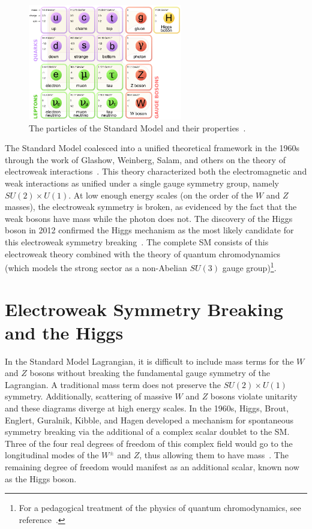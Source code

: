 \begin{figure}[h!]
  \centering
  \captionsetup{justification=centering}

  \includegraphics[width=0.6\textwidth]{figures/SM_particles}
  \caption{The particles of the Standard Model and their properties~\cite{PDG}.}
  \label{fig:sm_particles}
\end{figure}

The Standard Model coalesced into a unified theoretical framework in the 1960s through the work of Glashow, Weinberg, Salam, and others on the theory of electroweak interactions~\cite{Glashow, Weinberg, Salam, Glashow2}. This theory characterized both the electromagnetic and weak interactions as unified under a single gauge symmetry group, namely $SU(2) \times U(1)$. At low enough energy scales (on the order of the $W$ and $Z$ masses), the electroweak symmetry is broken, as evidenced by the fact that the weak bosons have mass while the photon does not. The discovery of the Higgs boson in 2012 confirmed the Higgs mechanism as the most likely candidate for this electroweak symmetry breaking~\cite{Discovery, CMSDiscovery}. The complete SM consists of this electroweak theory combined with the theory of quantum chromodynamics (which models the strong sector as a non-Abelian $SU(3)$ gauge group)\footnote{For a pedagogical treatment of the physics of quantum chromodynamics, see reference~\cite{QCDBook}.}. 

\section{Electroweak Symmetry Breaking and the Higgs}

In the Standard Model Lagrangian, it is difficult to include mass terms for the $W$ and $Z$ bosons without breaking the fundamental gauge symmetry of the Lagrangian. A traditional mass term does not preserve the $SU(2) \times U(1)$ symmetry. Additionally, scattering of massive $W$ and $Z$ bosons violate unitarity and these diagrams diverge at high energy scales. In the 1960s, Higgs, Brout, Englert, Guralnik, Kibble, and Hagen developed a mechanism for spontaneous symmetry breaking via the additional of a complex scalar doublet to the SM. Three of the four real degrees of freedom of this complex field would go to the longitudinal modes of the $W^{\pm}$ and $Z$, thus allowing them to have mass~\cite{Higgs1,Higgs2,Englert,Guralnik}. The remaining degree of freedom would manifest as an additional scalar, known now as the Higgs boson. 

